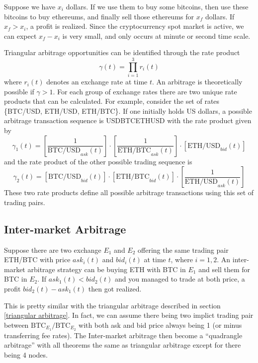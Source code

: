 \documentclass{manuscript}
\begin{document}
    Suppose we have $x_i$ dollars. If we use them to buy some bitcoins, then use these bitcoins to buy ethereums, and
    finally sell those ethereums for $x_f$ dollars. If $x_f > x_i$, a profit is realized. Since the cryptocurrency spot
    market is active, we can expect $x_f - x_i$ is very small, and only occurs at minute or second time scale.

    Triangular arbitrage opportunities can be identified through the rate product
    \[ \gamma(t) = \prod_{i=1}^{3}r_i(t) \]
    where $r_i(t)$ denotes an exchange rate at time $t$. An arbitrage is theoretically possible if $\gamma > 1$. For each
    group of exchange rates there are two unique rate products that can be calculated. For example, consider the set of
    rates \{BTC/USD, ETH/USD, ETH/BTC\}. If one initially holds US dollars, a possible arbitrage transaction sequence is
    USD\textrightarrow{}BTC\textrightarrow{}ETH\textrightarrow{}USD with the rate product given by
    \[ \gamma_1(t) = \left[\frac{1}{\text{BTC/USD}_{ask}(t)}\right]\cdot
                     \left[\frac{1}{\text{ETH/BTC}_{ask}(t)}\right]\cdot
                     \left[\text{ETH/USD}_{bid}(t)\right] \]
    and the rate product of the other possible trading sequence is
    \[ \gamma_2(t) = \left[\text{BTC/USD}_{bid}(t)\right]\cdot
                     \left[\text{ETH/BTC}_{bid}(t)\right]\cdot
                     \left[\frac{1}{\text{ETH/USD}_{ask}(t)}\right] \]
    These two rate products define all possible arbitrage transactions using this set of trading pairs.\cite{fenn2009mirage}

    \subsection{Inter-market Arbitrage}

    Suppose there are two exchange $E_1$ and $E_2$ offering the same trading pair ETH/BTC with price $ask_i(t)$ and $bid_i(t)$
    at time $t$, where $i = {1,2}$. An inter-market arbitrage strategy can be buying ETH with BTC in $E_1$ and sell them
    for BTC in $E_2$. If $ask_1(t) < bid_2(t)$ and you managed to trade at both price, a profit $bid_2(t) - ask_1(t)$
    then got realized.

    This is pretty similar with the triangular arbitrage described in section \ref{triangular arbitrage}. In fact, we can
    assume there being two implict trading pair between $\text{BTC}_{E_1} \text{/} \text{BTC}_{E_2}$ with both ask and
    bid price always being 1 (or minus transferring fee rates). The Inter-market arbitrage then become a ``quadrangle arbitrage''
    with all theorems the same as triangular arbitrage except for there being 4 nodes.
\end{document}
